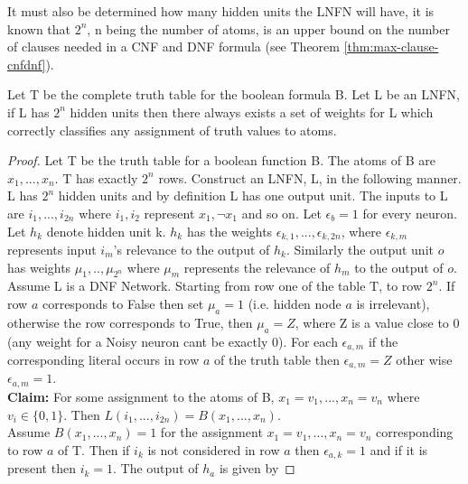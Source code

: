 It must also be determined how many hidden units the LNFN will have, it is known that $2^n$, n being the number of atoms, is an upper bound on the number of clauses needed in a CNF and DNF formula (see Theorem \ref{thm:max-clause-cnfdnf}).

\begin{theorem}
Let T be the complete truth table for the boolean formula B. Let L be an LNFN, if L has $2^n$ hidden units then there always exists a set of weights for L which correctly classifies any assignment of truth values to atoms.
\label{thm:upper-bound-hidden-units}
\end{theorem}

\begin{proof}
Let T be the truth table for a boolean function B. The atoms of B are $x_1, ..., x_n$. T has exactly $2^n$ rows. Construct an LNFN, L, in the following manner. L has $2^n$ hidden units and by definition L has one output unit. The inputs to L are $i_1, ..., i_{2n}$ where $i_1, i_2$ represent $x_1, \lnot x_1$ and so on. Let $\epsilon_b = 1$ for every neuron.\\

Let $h_k$ denote hidden unit k. $h_k$ has the weights $\epsilon_{k,1}, ..., \epsilon_{k,2n}$, where $\epsilon_{k, m}$ represents input $i_m$'s relevance to the output of $h_k$. Similarly the output unit $o$ has weights $\mu_1, .., \mu_{2^n}$ where $\mu_m$ represents the relevance of $h_m$ to the output of $o$.\\

Assume L is a DNF Network. Starting from row one of the table T, to row $2^n$. If row $a$ corresponds to False then set $\mu_a = 1$ (i.e. hidden node $a$ is irrelevant), otherwise the row corresponds to True, then $\mu_a = Z$, where Z is a value close to 0 (any weight for a Noisy neuron cant be exactly 0). For each $\epsilon_{a, m}$ if the corresponding literal occurs in row $a$ of the truth table then $\epsilon_{a, m} = Z$ other wise $\epsilon_{a, m} = 1$.\\

\textbf{Claim:} For some assignment to the atoms of B, $x_1 = v_1, ..., x_n = v_n$ where $v_i \in \{0, 1\}$. Then $L(i_1, ..., i_{2n}) = B(x_1, ..., x_n)$.\\

Assume $B(x_1, ..., x_n) = 1$ for the assignment $x_1 = v_1, ..., x_n = v_n$ corresponding to row $a$ of T. Then if $i_k$ is not considered in row $a$ then $\epsilon_{a,k} = 1$ and if it is present then $i_k = 1$. The output of $h_a$ is given by 


\end{proof}
